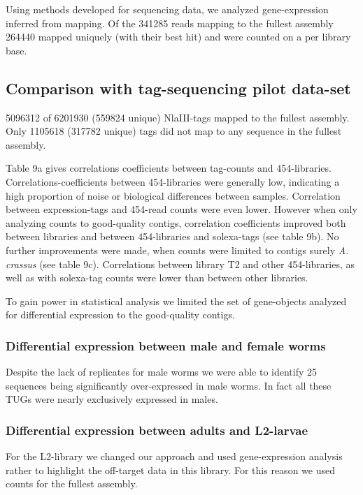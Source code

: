 \documentclass[10pt]{bmc_article}
\newenvironment{bmcformat}{\begin{raggedright}\baselineskip20pt\sloppy\setboolean{publ}{false}}{\end{raggedright}\baselineskip20pt\sloppy}
\begin{document}
\begin{bmcformat}
Using methods developed for sequencing data, we analyzed
gene-expression inferred from mapping. Of the 341285 reads
mapping to the fullest assembly 264440 mapped uniquely
(with their best hit) and were counted on a per library base.

\subsection*{Comparison with tag-sequencing pilot data-set}


5096312 of 6201930 (559824 unique) NlaIII-tags
mapped to the fullest assembly. Only 1105618
(317782 unique) tags did not map to any sequence in the
fullest assembly.

Table 9a gives correlations coefficients between tag-counts and
454-libraries. Correlations-coefficients between 454-libraries were
generally low, indicating a high proportion of noise or biological
differences between samples. Correlation between expression-tags and
454-read counts were even lower. However when only analyzing counts to
good-quality contigs, correlation coefficients improved both between
libraries and between 454-libraries and solexa-tags (see table 9b). No
further improvements were made, when counts were limited to contigs
surely \textit{A. crassus} (see table 9c). Correlations between
library T2 and other 454-libraries, as well as with solexa-tag counts
were lower than between other libraries.

To gain power in statistical analysis we limited the set of
gene-objects analyzed for differential expression to the good-quality
contigs.

\subsubsection*{Differential expression between male and female worms}

Despite the lack of replicates for male worms we were able to identify
25 sequences being significantly
over-expressed in male worms. In fact all these TUGs were nearly
exclusively expressed in males. 

\subsubsection*{Differential expression between adults and L2-larvae}

For the L2-library we changed our approach and used gene-expression
analysis rather to highlight the off-target data in this library. For
this reason we used counts for the fullest assembly.


\end{bmcformat}
\end{document}
